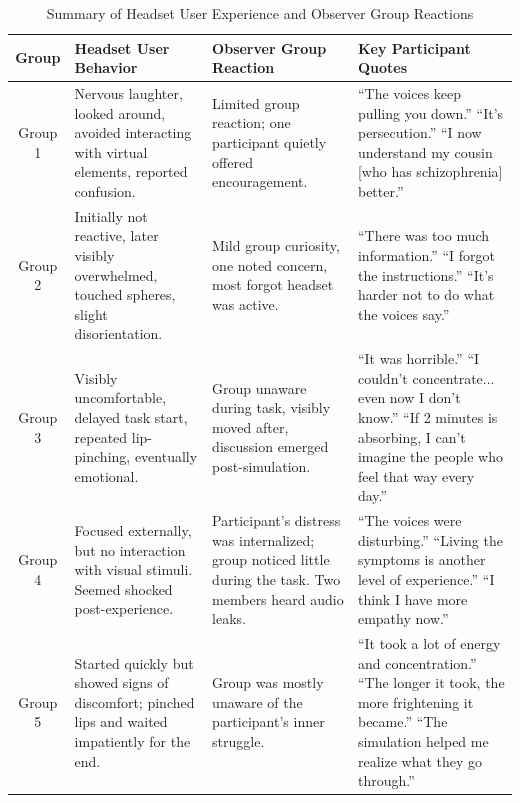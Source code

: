 \begin{table}[H]
\centering
\caption{Summary of Headset User Experience and Observer Group Reactions}
\begin{tabular}{|c|p{4.2cm}|p{4.2cm}|p{4.8cm}|}
\hline
\textbf{Group} & \textbf{Headset User Behavior} & \textbf{Observer Group Reaction} & \textbf{Key Participant Quotes} \\
\hline
Group 1 & Nervous laughter, looked around, avoided interacting with virtual elements, reported confusion. & Limited group reaction; one participant quietly offered encouragement. & “The voices keep pulling you down.” \newline “It’s persecution.” \newline “I now understand my cousin [who has schizophrenia] better.” \\
\hline
Group 2 & Initially not reactive, later visibly overwhelmed, touched spheres, slight disorientation. & Mild group curiosity, one noted concern, most forgot headset was active. & “There was too much information.” \newline “I forgot the instructions.” \newline “It's harder not to do what the voices say.” \\
\hline
Group 3 & Visibly uncomfortable, delayed task start, repeated lip-pinching, eventually emotional. & Group unaware during task, visibly moved after, discussion emerged post-simulation. & “It was horrible.” \newline “I couldn't concentrate... even now I don't know.” \newline “If 2 minutes is absorbing, I can't imagine the people who feel that way every day.” \\
\hline
Group 4 & Focused externally, but no interaction with visual stimuli. Seemed shocked post-experience. & Participant’s distress was internalized; group noticed little during the task. Two members heard audio leaks. & “The voices were disturbing.” \newline “Living the symptoms is another level of experience.” \newline “I think I have more empathy now.” \\

\hline
Group 5 & Started quickly but showed signs of discomfort; pinched lips and waited impatiently for the end. & Group was mostly unaware of the participant’s inner struggle. & “It took a lot of energy and concentration.” \newline “The longer it took, the more frightening it became.” \newline “The simulation helped me realize what they go through.” \\

\hline
\end{tabular}
\label{tab:qual_summary}
\end{table}

